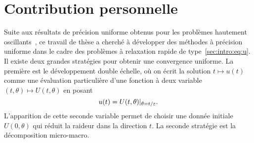 \section*{Contribution personnelle}


Suite aux résultats de précision uniforme obtenus pour les problèmes hautement oscillants~\cite{chartier.2015.uniformly,crouseilles.2017.nonlinear,chartier.2020.new}, ce travail de thèse a cherché à développer des méthodes à précision uniforme dans le cadre des problèmes à relaxation rapide de type~\eqref{sec:intro:eq:u}. 
Il existe deux grandes stratégies pour obtenir une convergence uniforme. La première est le développement double échelle, où on écrit la solution $t \mapsto u(t)$ comme une évaluation particulière d'une fonction à deux variable $(t,\theta) \mapsto U(t,\theta)$ en posant
\begin{equation*}
    u(t) = U(t,\theta)|_{\theta = t/\varepsilon} .
\end{equation*}
L'apparition de cette seconde variable permet de choisir une donnée initiale $U(0,\theta)$ qui réduit la raideur dans la direction $t$. La seconde stratégie est la décomposition micro-macro. 
%
%
